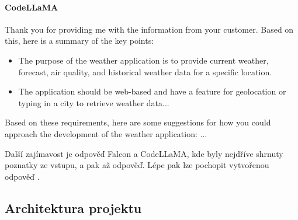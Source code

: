 \documentclass[FM,DP]{tulthesis}
\begin{document}
		\vspace{0.6em}
		\begin{tcolorbox}[colback=white,colframe=black]
			\paragraph{CodeLLaMA}
			
			Thank you for providing me with the information from your customer. Based on this, here is a summary of the key points:
			\begin{itemize}
				\item The purpose of the weather application is to provide current weather, forecast, air quality, and historical weather data for a specific location.
				\item The application should be web-based and have a feature for geolocation or typing in a city to retrieve weather data...
			\end{itemize}
			Based on these requirements, here are some suggestions for how you could approach the development of the weather application: 
			... \cite{codellama_analyza}
		\end{tcolorbox}
		\vspace{0.6em}
		
		Další zajímavost je odpověď Falcon a CodeLLaMA, kde byly nejdříve shrnuty poznatky ze vstupu, a pak až odpověď. Lépe pak lze pochopit vytvořenou odpověď \cite{codellama_analyza} \cite{falcon_analyza}.
		
		\subsection{Architektura projektu}
				
				
				
				
\end{document}
